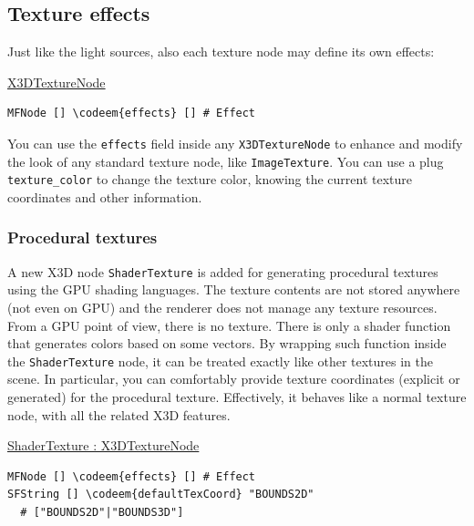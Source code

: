 \documentclass{egpubl}
\newenvironment{mycode}
{\begin{mycodecore}}
{\end{mycodecore}
\vspace{-0.1in}}
\newcommand*{\codeem}[1]{\textbf{#1}}
\begin{document}
\subsection{Texture effects}

Just like the light sources, also each texture node may define its own effects:

\begin{mycode}
\underline{X3DTextureNode}
\begin{Verbatim}[commandchars=\\\{\},fontsize=\small]
MFNode [] \codeem{effects} [] # Effect
\end{Verbatim}
\end{mycode}

You can use the \texttt{effects} field
inside any \texttt{X3DTextureNode} to enhance and modify the look of any
standard texture node, like \texttt{ImageTexture}.
You can use a plug \texttt{texture\_color} to change the texture color,
knowing the current texture coordinates and other information.

\subsubsection{Procedural textures}

A new X3D node \texttt{ShaderTexture} is added for generating
procedural textures using the GPU shading languages.
The texture contents are not stored anywhere (not even on GPU)
and the renderer does not manage any texture resources.
From a GPU point of view, there is no texture.
There is only a shader function that generates colors
based on some vectors. By wrapping such function inside
the \texttt{ShaderTexture} node, it can be treated exactly like other textures
in the scene.
In particular, you can comfortably provide texture coordinates
(explicit or generated) for the procedural texture.
Effectively, it behaves like a normal texture node, with all the related
X3D features.


\begin{mycode}
\underline{ShaderTexture : X3DTextureNode}
\begin{Verbatim}[commandchars=\\\{\},fontsize=\small]
MFNode [] \codeem{effects} [] # Effect
SFString [] \codeem{defaultTexCoord} "BOUNDS2D"
  # ["BOUNDS2D"|"BOUNDS3D"]
\end{Verbatim}
\end{mycode}
\end{document}
